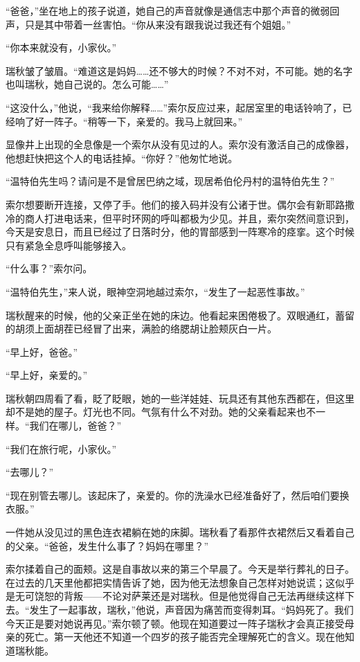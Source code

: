 \documentclass[AutoFakeBold=true]{book}
\begin{document}
``爸爸，''坐在地上的孩子说道，她自己的声音就像是通信志中那个声音的微弱回声，只是其中带着一丝害怕。``你从来没有跟我说过我还有个姐姐。''

``你本来就没有，小家伙。''

瑞秋皱了皱眉。``难道这是妈妈……还不够大的时候？不对不对，不可能。她的名字也叫瑞秋，她自己说的。怎么可能……''

``这没什么，''他说，``我来给你解释……''索尔反应过来，起居室里的电话铃响了，已经响了好一阵子。``稍等一下，亲爱的。我马上就回来。''

显像井上出现的全息像是一个索尔从没有见过的人。索尔没有激活自己的成像器，他想赶快把这个人的电话挂掉。``你好？''他匆忙地说。

``温特伯先生吗？请问是不是曾居巴纳之域，现居希伯伦丹村的温特伯先生？''

索尔想要断开连接，又停了手。他们的接入码并没有公诸于世。偶尔会有新耶路撒冷的商人打进电话来，但平时环网的呼叫都极为少见。并且，索尔突然间意识到，{\kaishu 今天是安息日，而且已经过了日落时分}，他的胃部感到一阵寒冷的痉挛。这个时候只有紧急全息呼叫能够接入。

``什么事？''索尔问。

``温特伯先生，''来人说，眼神空洞地越过索尔，``发生了一起恶性事故。''

\vspace*{1em}

瑞秋醒来的时候，他的父亲正坐在她的床边。他看起来困倦极了。双眼通红，蓄留的胡须上面胡茬已经冒了出来，满脸的络腮胡让脸颊灰白一片。

``早上好，爸爸。''

``早上好，亲爱的。''

瑞秋朝四周看了看，眨了眨眼，她的一些洋娃娃、玩具还有其他东西都在，但这里却不是她的屋子。灯光也不同。气氛有什么不对劲。她的父亲看起来也不一样。``我们在哪儿，爸爸？''

``我们在旅行呢，小家伙。''

``去哪儿？''

``现在别管去哪儿。该起床了，亲爱的。你的洗澡水已经准备好了，然后咱们要换衣服。''

一件她从没见过的黑色连衣裙躺在她的床脚。瑞秋看了看那件衣裙然后又看着自己的父亲。``爸爸，发生什么事了？妈妈在哪里？''

索尔揉着自己的面颊。这是自事故以来的第三个早晨了。今天是举行葬礼的日子。在过去的几天里他都把实情告诉了她，因为他无法想象自己怎样对她说谎；这似乎是无可饶恕的背叛——不论对萨莱还是对瑞秋。但是他觉得自己无法再继续这样下去。``发生了一起事故，瑞秋，''他说，声音因为痛苦而变得刺耳。``妈妈死了。我们今天正是要对她说再见。''索尔顿了顿。他现在知道要过一阵子瑞秋才会真正接受母亲的死亡。第一天他还不知道一个四岁的孩子能否完全理解死亡的含义。现在他知道瑞秋能。
\end{document}
